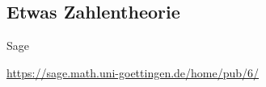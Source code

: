 \documentclass[notes=hide,hyperref={dvipdfmx,pdfpagelabels=false}]{beamer}
\begin{document}
\subsection{Etwas Zahlentheorie}
\begin{frame}[fragile]{Sage}
\begin{center}
\url{https://sage.math.uni-goettingen.de/home/pub/6/}
\end{center}
\end{frame}
%
%
\end{document}
